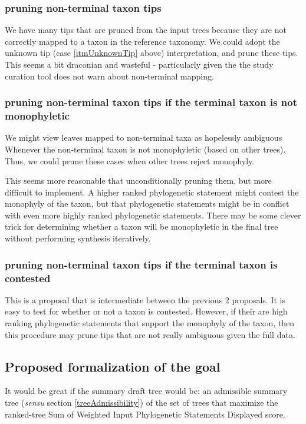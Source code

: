 \documentclass[11pt]{article}
\newcommand{\ps}{phylogenetic statement\xspace}
\newcommand{\pss}{phylogenetic statements\xspace}
\newcommand{\PSs}{Phylogenetic Statements\xspace}
\newcommand{\SWIPSD}{Sum of Weighted Input \PSs Displayed\xspace}
\begin{document}
\subsubsection{pruning non-terminal taxon tips}
We have many tips that are pruned from the input trees because they are 
    not correctly mapped to a taxon in the reference taxonomy.
We could adopt the unknown tip (case \ref{itmUnknownTip} above) interpretation,
    and prune these tips.
This seems a bit draconian and wasteful - particularly given the the study
    curation tool does not warn about non-terminal mapping.

\subsubsection{pruning non-terminal taxon tips if the terminal taxon is not monophyletic}
We might view leaves mapped to non-terminal taxa as hopelessly ambiguous Whenever the non-terminal
    taxon is not monophyletic (based on other trees).
Thus, we could prune these cases when other trees reject monophyly.

This seems more reasonable that unconditionally pruning them, but more difficult to implement.
A higher ranked \ps might contest the monophyly of the taxon, but that \pss might be 
    in conflict with even more highly ranked \pss.
There may be some clever trick for determining whether a taxon will be monophyletic in the
    final tree without performing synthesis iteratively.

\subsubsection{pruning non-terminal taxon tips if the terminal taxon is contested}
This is a proposal that is intermediate between the previous 2 proposals.
It is easy to test for whether or not a taxon is contested.
However, if their are high ranking \pss that support the monophyly of the taxon,
    then this procedure may prune tips that are not really ambiguous given 
    the full data.

\subsection{Proposed formalization of the goal}
It would be great if the summary draft tree would be:
    an admissible summary tree ({\em sensu} section \ref{treeAdmissibility}) of the set of trees
    that maximize the ranked-tree \SWIPSD score.
\end{document}
